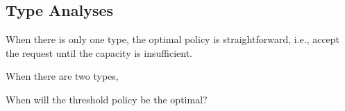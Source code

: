







\subsection{Type Analyses}

When there is only one type, the optimal policy is straightforward, i.e., accept the request until the capacity is insufficient. 

When there are two types, 

When will the threshold policy be the optimal?